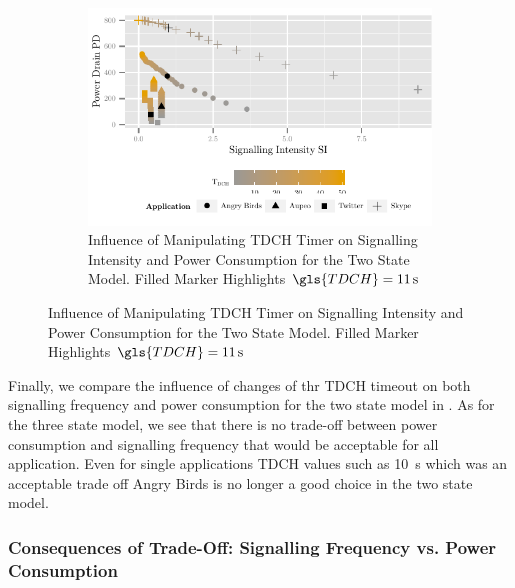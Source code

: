 \begin{figure}
	\begin{subfigure}[b]{\textwidth}
	\centering
	\includegraphics{network/network_traces/numerical_results/figures/2_state_signalling_vs_power_consumption}
	\caption{Influence of Manipulating \gls{TDCH} Timer on Signalling Intensity and Power Consumption for the Two State Model. Filled Marker Highlights \(\gls{TDCH} = \SI{11}{\second}\)}\label{fig:network:network_traces:numerical_results:two_states:trade_off}
	\end{subfigure}
\end{figure}
Finally, we compare the influence of changes of thr \gls{TDCH} timeout on both signalling frequency and power consumption for the two state model in .
As for the three state model, we see that there is no trade-off between power consumption and signalling frequency that would be acceptable for all application.
Even for single applications \gls{TDCH} values such as \SI{10}{\second} which was an acceptable trade off Angry Birds is no longer a good choice in the two state model.

\subsubsection*{Consequences of Trade-Off: Signalling Frequency vs. Power Consumption}\label{sec:network:network_traces:numerical_results:trade_off}

